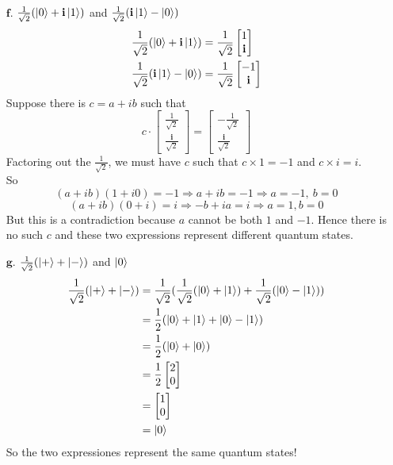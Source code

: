 \documentclass[11pt]{article}
\begin{document}
\begin{enumerate}
\item[$\textbf{f.}$] 
	$\frac{1}{\sqrt{2}}(\ket{0} + \textbf{i}\ket{1})$ and 
	$\frac{1}{\sqrt{2}}(\textbf{i}\ket{1} - \ket{0})$
	\begin{align*}
		\frac{1}{\sqrt{2}}(\ket{0} + \textbf{i}\ket{1}) &= 
		\frac{1}{\sqrt{2}}\begin{bmatrix}1 \\ \textbf{i}\end{bmatrix} \\
		\frac{1}{\sqrt{2}}(\textbf{i}\ket{1} - \ket{0}) &= 
		\frac{1}{\sqrt{2}}\begin{bmatrix}-1 \\ \textbf{i}\end{bmatrix}
	\end{align*}
	Suppose there is $c = a + ib$ such that 
	$$c \cdot \begin{bmatrix}
			\frac{1}{\sqrt{2}} \\ 
			\frac{\textbf{i}}{\sqrt{2}}\end{bmatrix} 
		= \begin{bmatrix}
		-\frac{1}{\sqrt{2}} \\ 
		\frac{\textbf{i}}{\sqrt{2}}\end{bmatrix}$$
	Factoring out the $\frac{1}{\sqrt{2}}$, we must have $c$ such that $c \times 1 = -1$ and $c \times i = i$.\\
	So $$(a + ib)(1 + i0) = -1 \Rightarrow a + ib = -1 \Rightarrow a = -1,\ b = 0$$
	$$(a + ib)(0 + i) = i \Rightarrow -b + ia = i \Rightarrow a = 1, b = 0$$
	But this is a contradiction because $a$ cannot be both $1$ and $-1$. 
	Hence there is no such $c$ and these two expressions represent different 
		quantum states.

\newpage
\item[$\textbf{g.}$] 
	$\frac{1}{\sqrt{2}}(\ket{+} + \ket{-})$ and $\ket{0}$
	\begin{align*}
	\frac{1}{\sqrt{2}}(\ket{+} + \ket{-}) 
		&= \frac{1}{\sqrt{2}}(\frac{1}{\sqrt{2}}(\ket{0} + \ket{1}) 
		+ \frac{1}{\sqrt{2}}(\ket{0} - \ket{1})) \\
		&= \frac{1}{2}(\ket{0} + \ket{1} + \ket{0} - \ket{1}) \\
		&= \frac{1}{2}(\ket{0} + \ket{0}) \\
		&= \frac{1}{2}\begin{bmatrix}
			2\\0
			\end{bmatrix} \\
		&= \begin{bmatrix} 1 \\ 0 \end{bmatrix} \\
		&= \ket{0}
	\end{align*}
	So the two expressiones represent the same quantum states!


\end{enumerate}
\end{document}
